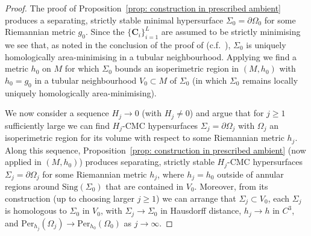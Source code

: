\documentclass[12pt]{article}
\begin{document}
\begin{proof}
The proof of Proposition~\ref{prop: construction in prescribed ambient} produces a separating, strictly stable minimal hypersurface $\Sigma_0 = \partial \Omega_0$ for some Riemannian metric $g_0$. Since the $\{\mathbf{C}_i\}_{i = 1}^L$ are assumed to be strictly minimising we see that, as noted in the conclusion of the proof of \cite[Theorem 3]{MN26} (c.f.~\cite[Pages 2323-2324]{S00}), $\Sigma_0$ is uniquely homologically area-minimising in a tubular neighbourhood. Applying \cite[Corollary 1]{MN26} we find a metric $h_0$ on $M$ for which $\Sigma_0$ bounds an isoperimetric region in $(M,h_0)$ with $h_0 = g_0$ in a tubular neighbourhood $V_0 \subset M$ of $\Sigma_0$ (in which $\Sigma_0$ remains locally uniquely homologically area-minimising). 

\bigskip

We now consider a sequence $H_j \rightarrow 0$ (with $H_j \neq 0$) and argue that for $j \geq 1$ sufficiently large we can find $H_j$-CMC hypersurfaces $\Sigma_j = \partial \Omega_j$ with $\Omega_j$ an isoperimetric region for its volume with respect to some Riemannian metric $h_j$. Along this sequence, Proposition~\ref{prop: construction in prescribed ambient} (now applied in $(M,h_0)$) produces separating, strictly stable $H_j$-CMC hypersurfaces $\Sigma_j = \partial \Omega_j$ for some Riemannian metric $h_j$, where $h_j = h_0$ outside of annular regions around $\mathrm{Sing}(\Sigma_0)$ that are contained in $V_0$. Moreover, from its construction (up to choosing larger $j \geq 1$) we can arrange that $\Sigma_j \subset V_0$, each $\Sigma_j$ is homologous to $\Sigma_0$ in $V_0$, with $\Sigma_j \rightarrow \Sigma_0$ in Hausdorff distance, $h_j \rightarrow h$ in $C^3$, and $\mathrm{Per}_{h_j}(\Omega_j) \rightarrow \mathrm{Per}_{h_0}(\Omega_0)$ as $j \rightarrow \infty$.

\bigskip


\end{proof}
\end{document}
